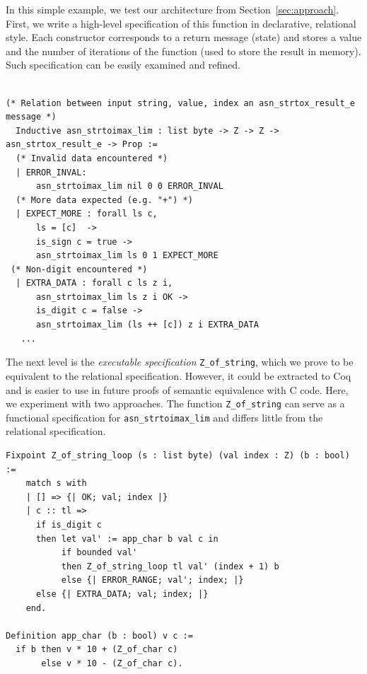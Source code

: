 \documentclass[acmsmall,nonacm]{acmart}
\begin{document}
In this simple example, we test our architecture from
Section~\ref{sec:approach}. First, we write a high-level specification
of this function in declarative, relational style. Each constructor
corresponds to a return message (state) and stores a value and the
number of iterations of the function (used to store the result in
memory). Such specification can be easily examined and refined.

 \begin{lstlisting}[language=Coq]

(* Relation between input string, value, index an asn_strtox_result_e message *)
  Inductive asn_strtoimax_lim : list byte -> Z -> Z -> asn_strtox_result_e -> Prop :=
  (* Invalid data encountered *)
  | ERROR_INVAL:
      asn_strtoimax_lim nil 0 0 ERROR_INVAL
  (* More data expected (e.g. "+") *)
  | EXPECT_MORE : forall ls c,
      ls = [c]  ->
      is_sign c = true ->
      asn_strtoimax_lim ls 0 1 EXPECT_MORE
 (* Non-digit encountered *)
  | EXTRA_DATA : forall c ls z i,
      asn_strtoimax_lim ls z i OK ->
      is_digit c = false -> 
      asn_strtoimax_lim (ls ++ [c]) z i EXTRA_DATA
   ...    
  \end{lstlisting}

  The next level is the \textit{executable specification}
  \texttt{Z\_of\_string}, which we prove to be equivalent to the
  relational specification. However, it could be extracted to Coq and
  is easier to use in future proofs of semantic equivalence with C
  code. Here, we experiment with two approaches. The function 
   \texttt{Z\_of\_string} can serve as a functional specification for
  \texttt{asn\_strtoimax\_lim} and differs little from the
  relational specification. \newpage

 \begin{lstlisting}[language=Coq]
Fixpoint Z_of_string_loop (s : list byte) (val index : Z) (b : bool) := 
    match s with 
    | [] => {| OK; val; index |}
    | c :: tl => 
      if is_digit c
      then let val' := app_char b val c in 
           if bounded val'
           then Z_of_string_loop tl val' (index + 1) b
           else {| ERROR_RANGE; val'; index; |}      
      else {| EXTRA_DATA; val; index; |}              
    end.

Definition app_char (b : bool) v c := 
  if b then v * 10 + (Z_of_char c) 
       else v * 10 - (Z_of_char c).
 \end{lstlisting}
\end{document}

